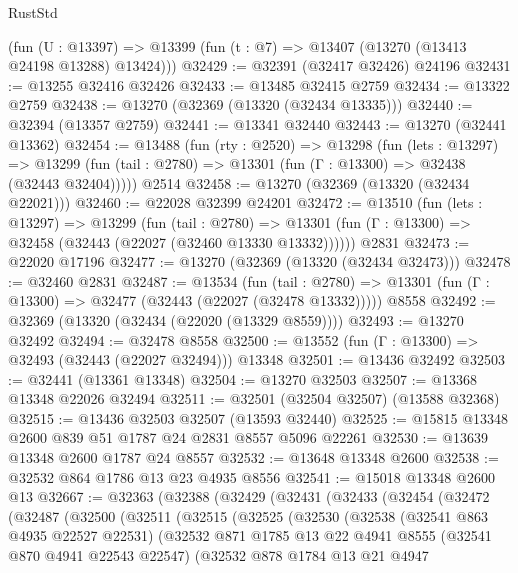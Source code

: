 \begin{lexlean}{RustStd}
\begin{coremodule}
    (fun (U : @13397) => @13399 (fun (t : @7) => @13407 (@13270 (@13413 @24198 @13288) @13424)))
@32429 := @32391 (@32417 @32426) @24196
@32431 := @13255 @32416 @32426
@32433 := @13485 @32415 @2759
@32434 := @13322 @2759
@32438 := @13270 (@32369 (@13320 (@32434 @13335)))
@32440 := @32394 (@13357 @2759)
@32441 := @13341 @32440
@32443 := @13270 (@32441 @13362)
@32454 := @13488
    (fun (rty : @2520) =>
    @13298
      (fun (lets : @13297) =>
      @13299 (fun (tail : @2780) => @13301 (fun (Γ : @13300) => @32438 (@32443 @32404)))))
    @2514
@32458 := @13270 (@32369 (@13320 (@32434 @22021)))
@32460 := @22028 @32399 @24201
@32472 := @13510
    (fun (lets : @13297) =>
    @13299
      (fun (tail : @2780) =>
      @13301 (fun (Γ : @13300) => @32458 (@32443 (@22027 (@32460 @13330 @13332))))))
    @2831
@32473 := @22020 @17196
@32477 := @13270 (@32369 (@13320 (@32434 @32473)))
@32478 := @32460 @2831
@32487 := @13534
    (fun (tail : @2780) => @13301 (fun (Γ : @13300) => @32477 (@32443 (@22027 (@32478 @13332)))))
    @8558
@32492 := @32369 (@13320 (@32434 (@22020 (@13329 @8559))))
@32493 := @13270 @32492
@32494 := @32478 @8558
@32500 := @13552 (fun (Γ : @13300) => @32493 (@32443 (@22027 @32494))) @13348
@32501 := @13436 @32492
@32503 := @32441 (@13361 @13348)
@32504 := @13270 @32503
@32507 := @13368 @13348 @22026 @32494
@32511 := @32501 (@32504 @32507) (@13588 @32368)
@32515 := @13436 @32503 @32507 (@13593 @32440)
@32525 := @15815 @13348 @2600 @839 @51 @1787 @24 @2831 @8557 @5096 @22261
@32530 := @13639 @13348 @2600 @1787 @24 @8557
@32532 := @13648 @13348 @2600
@32538 := @32532 @864 @1786 @13 @23 @4935 @8556
@32541 := @15018 @13348 @2600 @13
@32667 := @32363
    (@32388
      (@32429
        (@32431
          (@32433
            (@32454
              (@32472
                (@32487
                  (@32500
                    (@32511
                      (@32515
                        (@32525
                          (@32530
                            (@32538
                              (@32541 @863 @4935 @22527 @22531)
                              (@32532
                                @871
                                @1785
                                @13
                                @22
                                @4941
                                @8555
                                (@32541 @870 @4941 @22543 @22547)
                                (@32532
                                  @878
                                  @1784
                                  @13
                                  @21
                                  @4947

\end{coremodule}
\end{lexlean}
